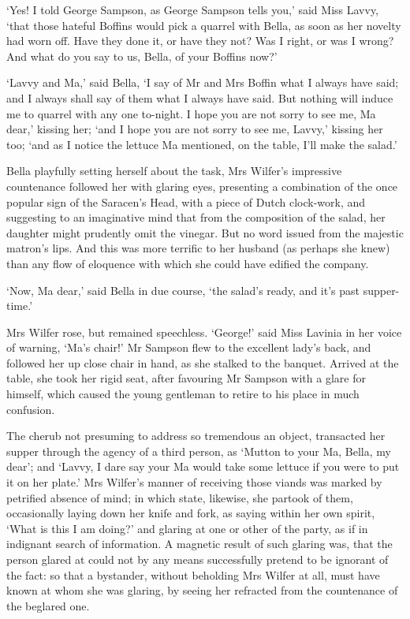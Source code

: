 ‘Yes! I told George Sampson, as George Sampson tells you,’ said Miss
Lavvy, ‘that those hateful Boffins would pick a quarrel with Bella, as
soon as her novelty had worn off. Have they done it, or have they not?
Was I right, or was I wrong? And what do you say to us, Bella, of your
Boffins now?’

‘Lavvy and Ma,’ said Bella, ‘I say of Mr and Mrs Boffin what I always
have said; and I always shall say of them what I always have said. But
nothing will induce me to quarrel with any one to-night. I hope you
are not sorry to see me, Ma dear,’ kissing her; ‘and I hope you are not
sorry to see me, Lavvy,’ kissing her too; ‘and as I notice the lettuce
Ma mentioned, on the table, I’ll make the salad.’

Bella playfully setting herself about the task, Mrs Wilfer’s impressive
countenance followed her with glaring eyes, presenting a combination
of the once popular sign of the Saracen’s Head, with a piece of
Dutch clock-work, and suggesting to an imaginative mind that from the
composition of the salad, her daughter might prudently omit the vinegar.
But no word issued from the majestic matron’s lips. And this was more
terrific to her husband (as perhaps she knew) than any flow of eloquence
with which she could have edified the company.

‘Now, Ma dear,’ said Bella in due course, ‘the salad’s ready, and it’s
past supper-time.’

Mrs Wilfer rose, but remained speechless. ‘George!’ said Miss Lavinia
in her voice of warning, ‘Ma’s chair!’ Mr Sampson flew to the excellent
lady’s back, and followed her up close chair in hand, as she stalked
to the banquet. Arrived at the table, she took her rigid seat, after
favouring Mr Sampson with a glare for himself, which caused the young
gentleman to retire to his place in much confusion.

The cherub not presuming to address so tremendous an object, transacted
her supper through the agency of a third person, as ‘Mutton to your Ma,
Bella, my dear’; and ‘Lavvy, I dare say your Ma would take some lettuce
if you were to put it on her plate.’ Mrs Wilfer’s manner of receiving
those viands was marked by petrified absence of mind; in which state,
likewise, she partook of them, occasionally laying down her knife and
fork, as saying within her own spirit, ‘What is this I am doing?’ and
glaring at one or other of the party, as if in indignant search of
information. A magnetic result of such glaring was, that the person
glared at could not by any means successfully pretend to be ignorant of
the fact: so that a bystander, without beholding Mrs Wilfer at all, must
have known at whom she was glaring, by seeing her refracted from the
countenance of the beglared one.


